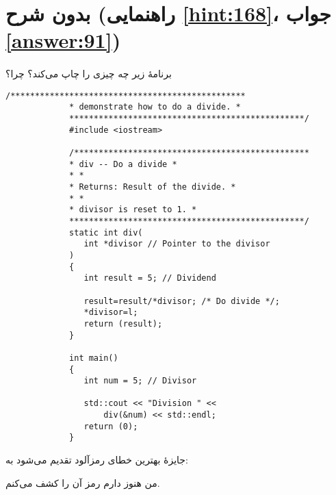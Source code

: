 \section[بدون شرح]{بدون شرح \protect{} (راهنمایی \ref{hint:168}، جواب \ref{answer:91})}
\paragraph{}\label{prog:21}
برنامهٔ زیر چه چیزی را چاپ می‌کند؟ چرا؟

\begin{LTR}
        \begin{lstlisting}[style=C++Style]
             /************************************************
             * demonstrate how to do a divide. *
             ************************************************/
             #include <iostream>

             /************************************************
             * div -- Do a divide *
             * *
             * Returns: Result of the divide. *
             * *
             * divisor is reset to 1. *
             ************************************************/
             static int div(
             	int *divisor // Pointer to the divisor
             )
             {
             	int result = 5; // Dividend

             	result=result/*divisor; /* Do divide */;
             	*divisor=l;
             	return (result);
             }

             int main()
             {
             	int num = 5; // Divisor

             	std::cout << "Division " <<
             		div(&num) << std::endl;
             	return (0);
             }
        \end{lstlisting}
\end{LTR}

\begin{tcolorbox}
    \centering
    جایزهٔ بهترین خطای رمزآلود تقدیم می‌شود به:


    من هنوز دارم رمز آن را کشف می‌کنم.
\end{tcolorbox}